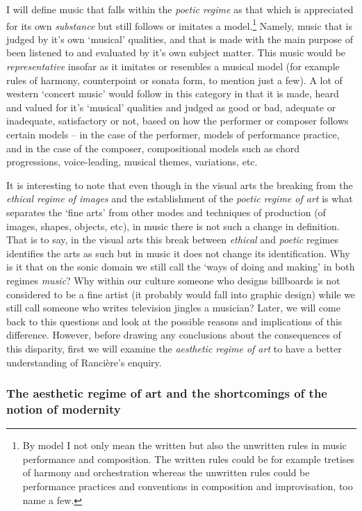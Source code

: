 I will define music that falls within the \emph{poetic regime} as that which is appreciated for its own \emph{substance} but still follows or imitates a model.\footnote{By model I not only mean the written but also the unwritten rules in music performance and composition. The written rules could be for example tretises of harmony and orchestration whereas the unwritten rules could be performance practices and conventions in composition and improvisation, too name a few.} Namely, music that is judged by it's own `musical' qualities, and that is made with the main purpose of been listened to and evaluated by it's own subject matter. This music would be \emph{representative} insofar as it imitates or resembles a musical model (for example rules of harmony, counterpoint or sonata form, to mention just a few). A lot of western `concert music' would follow in this category in that it is made, heard and valued for it's `musical' qualities and judged as good or bad, adequate or inadequate, satisfactory or not, based on how the performer or composer follows certain models -- in the case of the performer, models of performance practice, and in the case of the composer, compositional models such as chord progressions, voice-leading, musical themes, variations, etc. 

It is interesting to note that even though in the visual arts the breaking from the \emph{ethical regime of images} and the establishment of the \emph{poetic regime of art} is what separates the `fine arts' from other modes and techniques of production (of images, shapes, objects, etc), in music there is not such a change in definition. That is to say, in the visual arts this break between \emph{ethical} and \emph{poetic} regimes identifies the arts as such but in music it does not change its identification. Why is it that on the sonic domain we still call the `ways of doing and making' in both regimes \emph{music}? Why within our culture someone who designs billboards is not considered to be a fine artist (it probably would fall into graphic design) while we still call someone who writes television jingles a musician? Later, we will come back to this questions and look at the possible reasons and implications of this difference. However, before drawing any conclusions about the consequences of this disparity, first we will examine the \emph{aesthetic regime of art} to have a better understanding of Ranci\`{e}re's enquiry.

\subsubsection{The aesthetic regime of art and the shortcomings of the notion of modernity}

